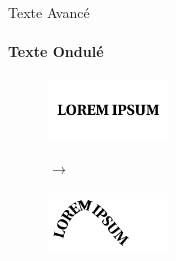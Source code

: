\documentclass[10pt,svgnames,usenames,table]{beamer}
\begin{document}
\begin{frame}{Texte Avancé}
		\framesubtitle{Texte Ondulé}
		\begin{figure}[H]
			\centering
			\begin{minipage}{.5\textwidth}
				\centering
				\includegraphics[height=60px]{Images/text/lorem} 
				\end{minipage}$\rightarrow$%
			\begin{minipage}{.5\textwidth}
				\centering
				\includegraphics[height=60px]{Images/text/courbf} 
				\end{minipage}
			\end{figure}
\end{frame}
\end{document}
